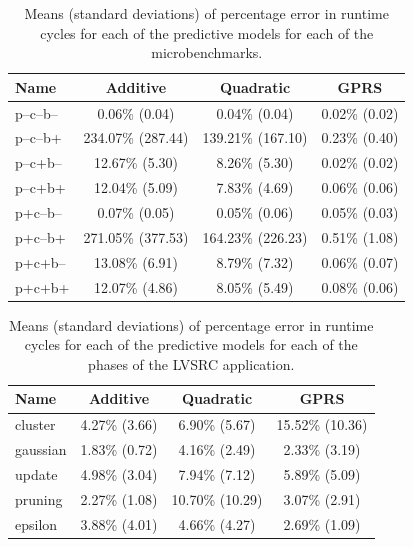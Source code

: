 \begin{table}
\small
\begin{tabular}{|l|c|c|c|}
\hline
Name & Additive & Quadratic & GPRS \\ \hline
 p--c--b-- & 0.06\% (0.04) & 0.04\% (0.04) &0.02\% (0.02) \\ \hline
 p--c--b+ &   234.07\% (287.44) & 139.21\% (167.10) &  0.23\% (0.40)   \\ \hline
 p--c+b-- &  12.67\% (5.30) &  8.26\% (5.30) &  0.02\% (0.02) \\ \hline
 p--c+b+ &  12.04\% (5.09) &  7.83\% (4.69) & 0.06\% (0.06)  \\ \hline
 p+c--b-- &  0.07\% (0.05) &  0.05\% (0.06)  &  0.05\% (0.03)  \\ \hline
 p+c--b+ &  271.05\% (377.53) & 164.23\% (226.23) & 0.51\% (1.08) \\ \hline
 p+c+b--&  13.08\% (6.91) & 8.79\% (7.32) & 0.06\% (0.07) \\ \hline
 p+c+b+&  12.07\% (4.86) &  8.05\% (5.49) & 0.08\% (0.06)  \\ \hline
   \end{tabular}
 \caption{Means (standard deviations) of percentage error in runtime cycles for each of the predictive models for each of the microbenchmarks.}
\label{table:acc-cycles}
\end{table}

\begin{table}
\small
\begin{tabular}{|l|c|c|c|}
\hline
Name & Additive & Quadratic & GPRS \\ \hline
 cluster &  4.27\% (3.66) & 6.90\% (5.67)  & 15.52\% (10.36)  \\ \hline
 gaussian&  1.83\% (0.72) & 4.16\% (2.49) & 2.33\% (3.19)  \\ \hline
 update&  4.98\% (3.04) & 7.94\% (7.12)  & 5.89\% (5.09)  \\ \hline
 pruning&  2.27\% (1.08) & 10.70\% (10.29)  & 3.07\% (2.91)  \\ \hline
 epsilon &  3.88\% (4.01) & 4.66\% (4.27)  & 2.69\% (1.09)  \\ \hline
   \end{tabular}
 \caption{Means (standard deviations) of percentage error in runtime cycles for each of the predictive models for each of the phases of the LVSRC application.}
\label{table:acc-cycles-lvsrc}
\end{table}

